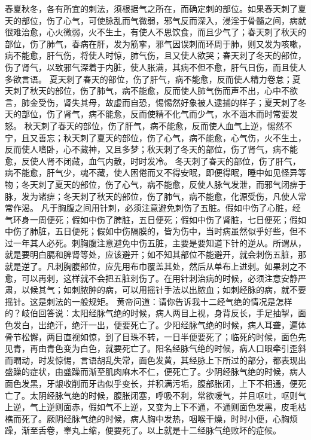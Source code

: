 \documentclass[a4paper,12pt,UTF8,twoside]{ctexbook}
\begin{document}
春夏秋冬，各有所宜的刺法，须根据气之所在，而确定刺的部位。如果春天刺了夏天的部位，伤了心气，可使脉乱而气微弱，邪气反而深入，浸淫于骨髓之间，病就很难治愈，心火微弱，火不生土，有使人不思饮食，而且少气了；春天刺了秋天的部位，伤了肺气，春病在肝，发为筋挛，邪气因误刺而环周于肺，则又发为咳嗽，病不能愈，肝气伤，将使人时惊，肺气伤，且又使人欲哭；春天刺了冬天的部位，伤了肾气，以致邪气深着于内脏，使人胀满，其病不但不愈，肝气日伤，而且使人多欲言语。
夏天刺了春天的部位，伤了肝气，病不能愈，反而使人精力卷怠；夏天刺了秋天的部位，伤了肺气，病不能愈，反而使人肺气伤而声不出，心中不欲言，肺金受伤，肾失其母，故虚而自恐，惕惕然好象被人逮捕的样子；夏天刺了冬天的部位，伤了肾气，病不能愈，反而使精不化气而少气，水不涵木而时常要发怒。
秋天刺了春天的部位，伤了肝气，病不能愈，反而使人血气上逆，惕然不宁，且又善忘；秋天刺了夏天的部位，伤了心气，病不能愈，心气伤，火不生土，反而使人嗜卧，心不藏神，又且多梦；秋天刺了冬天的部位，伤了肾气，病不能愈，反使人肾不闭藏，血气内散，时时发冷。
冬天刺了春天的部位，伤了肝气，病不能愈，肝气少，魂不藏，使人困倦而又不得安眠，即便得眠，睡中如见怪异等物；冬天刺了夏天的部位，伤了心气，病不能愈，反使人脉气发泄，而邪气闭痹于脉，发为诸痹；冬天刺了秋天的部位，伤了肺气，病不能愈，化源受伤，凡使人常常作渴。
凡于胸腹之间用针刺，必须注意避免刺伤了五脏。假如中伤了心脏，经气环身一周便死；假如中伤了脾脏，五日便死；假如中伤了肾脏，七日便死；假如中伤了肺脏，五日便死；假如中伤隔膜的，皆为伤中，当时病虽然似乎好些，但不过一年其人必死。刺胸腹注意避免中伤五脏，主要是要知道下针的逆从。所谓从，就是要明白膈和脾肾等处，应该避开；如不知其部位不能避开，就会刺伤五脏，那就是逆了。凡刺胸腹部位，应先用布巾覆盖其处，然后从单布上进刺。如果刺之不愈，可以再刺，这样就不会把五脏刺伤了。在用针刺治病的时候，必须注意安静严肃，以候其气；如刺脓肿的病，可以用摇针手法以出脓血；如刺经脉的病，就不要摇针。这是刺法的一般规矩。
黄帝问道：请你告诉我十二经气绝的情况是怎样的？岐伯回答说：太阳经脉气绝的时候，病人两目上视，身背反长，手足抽掣，面色发白，出绝汗，绝汗一出，便要死亡了。少阳经脉气绝的时候，病人耳聋，遍体骨节松懈，两目直视如惊，到了目珠不转，一日半便要死了；临死的时候，面色先见青，再由青色变为白色，就要死亡了。阳名经脉气绝的时候，病人口眼牵引歪斜而瞤动，时发惊惕，言语胡乱失常，面色发黄，其经脉上下所过的部分，都表现出盛躁的症状，由盛躁而渐至肌肉麻木不仁，便死亡了。少阴经脉气绝的时候，病人面色发黑，牙龈收削而牙齿似乎变长，并积满污垢，腹部胀闭，上下不相通，便死亡了。太阴经脉气绝的时候，腹胀闭塞，呼吸不利，常欲嗳气，并且呕吐，呕则气上逆，气上逆则面赤，假如气不上逆，又变为上下不通，不通则面色发黑，皮毛枯樵而死了。厥阴经脉气绝的时候，病人胸中发热，咽喉干燥，时时小便，心胸烦躁，渐至舌卷，睾丸上缩，便要死了。以上就是十二经脉气绝败坏的症候。
\end{document}
